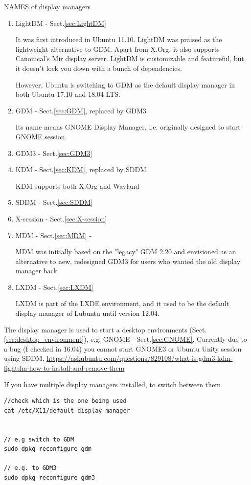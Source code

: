 NAMES of display managers
\begin{enumerate}
  \item LightDM - Sect.\ref{sec:LightDM} 
  
  It was first introduced in Ubuntu 11.10.
  LightDM was praised as the lightweight alternative to GDM. Apart from X.Org,
  it also supports Canonical's Mir display server.
  LightDM is customizable and featureful, but it doesn't lock you down with a
  bunch of dependencies.
  
   However, Ubuntu is switching to GDM as the default display manager in both
   Ubuntu 17.10 and 18.04 LTS.	
  
  
  \item GDM - Sect.\ref{sec:GDM}, replaced by GDM3
  
  Its name means GNOME Display Manager, i.e. originally designed to start GNOME
  session.
  
  \item GDM3 - Sect.\ref{sec:GDM3}
  \item KDM - Sect.\ref{sec:KDM}, replaced by SDDM

KDM supports both X.Org and Wayland
  
  \item SDDM - Sect.\ref{sec:SDDM}


  \item X-session - Sect.\ref{sec:X-session}
  
  \item MDM - Sect.\ref{sec:MDM} - 
  
MDM was initially based on the "legacy" GDM 2.20 and envisioned as an
alternative to new, redesigned GDM3 for users who wanted the old display manager
back.

\item LXDM - Sect.\ref{sec:LXDM}

LXDM is part of the LXDE environment, and it used to be the default display
manager of Lubuntu until version 12.04. 
\end{enumerate}

The display manager is used to start a desktop environments
(Sect.\ref{sec:desktop_environment}), e.g. GNOME - Sect.\ref{sec:GNOME}.
Currently due to a bug (I checked in 16.04) you cannot start GNOME3 or Ubuntu
Unity session using SDDM.
\url{https://askubuntu.com/questions/829108/what-is-gdm3-kdm-lightdm-how-to-install-and-remove-them}

If you have multiple display managers installed, to switch between them
\begin{verbatim}
//check which is the one being used
cat /etc/X11/default-display-manager


// e.g switch to GDM
sudo dpkg-reconfigure gdm

// e.g. to GDM3
sudo dpkg-reconfigure gdm3
\end{verbatim}

